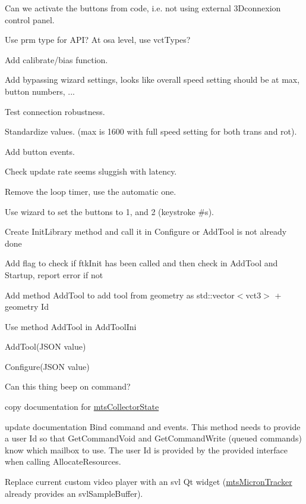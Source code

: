 
\begin{DoxyRefList}
\item[\label{todo__todo000012}%
\hypertarget{todo__todo000012}{}%
File \hyperlink{mts3_dconnexion_8h}{mts3\+Dconnexion.h} ]Can we activate the buttons from code, i.\+e. not using external 3\+Dconnexion control panel. 

Use prm type for A\+P\+I? At osa level, use vct\+Types? 

Add calibrate/bias function. 

Add bypassing wizard settings, looks like overall speed setting should be at max, button numbers, ... 

Test connection robustness. 

Standardize values. (max is 1600 with full speed setting for both trans and rot). 

Add button events. 

Check update rate seems sluggish with latency. 

Remove the loop timer, use the automatic one. 

Use wizard to set the buttons to 1, and 2 (keystroke \#s).  
\item[\label{todo__todo000013}%
\hypertarget{todo__todo000013}{}%
Class \hyperlink{classmts_atracsys_fusion_track}{mts\+Atracsys\+Fusion\+Track} ]Create Init\+Library method and call it in Configure or Add\+Tool is not already done 

Add flag to check if ftk\+Init has been called and then check in Add\+Tool and Startup, report error if not 

Add method Add\+Tool to add tool from geometry as std\+::vector$<$vct3$>$ + geometry Id 

Use method Add\+Tool in Add\+Tool\+Ini 

Add\+Tool(\+J\+S\+O\+N value) 

Configure(\+J\+S\+O\+N value) 

Can this thing beep on command?  
\item[\label{todo__todo000007}%
\hypertarget{todo__todo000007}{}%
Member \hyperlink{classmts_collector_event_a9e9b47581d6445e5f0c5a71f70afe8e7}{mts\+Collector\+Event\+:\+:Connect} (void)]copy documentation for \hyperlink{classmts_collector_state}{mts\+Collector\+State}  
\item[\label{todo__todo000008}%
\hypertarget{todo__todo000008}{}%
Member \hyperlink{classmts_interface_required_a8830a8a10b35d4a57396edbb4e328012}{mts\+Interface\+Required\+:\+:Add\+System\+Event\+Handlers} (void)]update documentation Bind command and events. This method needs to provide a user Id so that Get\+Command\+Void and Get\+Command\+Write (queued commands) know which mailbox to use. The user Id is provided by the provided interface when calling Allocate\+Resources.  
\item[\label{todo__todo000014}%
\hypertarget{todo__todo000014}{}%
File \hyperlink{mts_micron_tracker_8h}{mts\+Micron\+Tracker.h} ]Replace current custom video player with an svl Qt widget (\hyperlink{classmts_micron_tracker}{mts\+Micron\+Tracker} already provides an svl\+Sample\+Buffer). 


\end{DoxyRefList}
